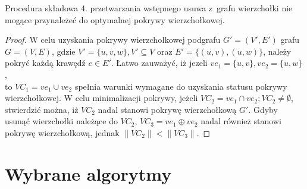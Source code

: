   \begin{theorem}
    Procedura składowa 4. przetwarzania wstępnego usuwa z~grafu wierzchołki nie 
    mogące przynależeć do optymalnej pokrywy wierzchołkowej.
  \end{theorem}
  \begin{proof}
    W celu uzyskania pokrywy wierzchołkowej podgrafu $G\prime=(V\prime,E\prime)$
    grafu $G=(V,E)$, gdzie $V\prime=\{u, v, w\}, V\prime \subseteq V$ oraz 
    $E\prime=\{(u,v), (u,w)\}$, należy pokryć każdą krawędź $e \in E\prime$. 
    Łatwo zauważyć, iż jezeli $ve_1=\{u,v\}, ve_2=\{u,w\}$, \\
    to $VC_1=ve_1 \cup ve_2$ spełnia warunki wymagane do uzyskania statusu
    pokrywy wierzchołkowej.
    W celu minimalizacji pokrywy, jeżeli $VC_2=ve_1 \cap ve_2; VC_2 \neq \emptyset$,
    stwierdzić można, iż $VC_2$ nadal stanowi pokrywę wierzchołkową $G\prime$.
    Gdyby usunąć wierzchołki należące do $VC_2$, $VC_3=ve_1 \oplus ve_2$ nadal
    również stanowi pokrywę wierzchołkową, jednak $\|VC_2\| < \|VC_3\|$.
  \end{proof}

\chapter{Wybrane algorytmy }\label{Chapter_Algorytmy}

